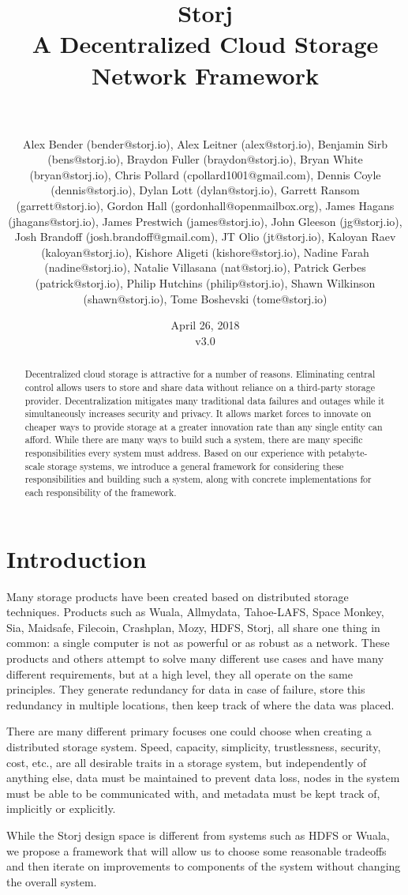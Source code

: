 \documentclass[a4paper,10pt]{article}
\title{\textbf{Storj\\A Decentralized Cloud Storage Network Framework}}
\author{\\
\parbox{\linewidth}{\centering\small
Alex Bender (bender@storj.io),
Alex Leitner (alex@storj.io),
Benjamin Sirb (bens@storj.io),
Braydon Fuller (braydon@storj.io),
Bryan White (bryan@storj.io),
Chris Pollard (cpollard1001@gmail.com),
Dennis Coyle (dennis@storj.io),
Dylan Lott (dylan@storj.io),
Garrett Ransom (garrett@storj.io),
Gordon Hall (gordonhall@openmailbox.org),
James Hagans (jhagans@storj.io),
James Prestwich (james@storj.io),
John Gleeson (jg@storj.io),
Josh Brandoff (josh.brandoff@gmail.com),
JT Olio (jt@storj.io),
Kaloyan Raev (kaloyan@storj.io),
Kishore Aligeti (kishore@storj.io),
Nadine Farah (nadine@storj.io),
Natalie Villasana (nat@storj.io),
Patrick Gerbes (patrick@storj.io),
Philip Hutchins (philip@storj.io),
Shawn Wilkinson (shawn@storj.io),
Tome Boshevski (tome@storj.io)}
}
\date {April 26, 2018 \\ v3.0}
\begin{document}
\maketitle

\begin{abstract}
Decentralized cloud storage is attractive for a number of reasons. Eliminating
central control allows users to store and share data without reliance on a
third-party storage provider. Decentralization mitigates many traditional data
failures and outages while it simultaneously increases security and privacy. It
allows market forces to innovate on cheaper ways to provide storage at a greater
innovation rate than any single entity can afford. While there are many ways to
build such a system, there are many specific responsibilities every system must
address. Based on our experience with petabyte-scale storage systems, we
introduce a general framework for considering these responsibilities and
building such a system, along with concrete implementations for each
responsibility of the framework.
\end{abstract}

\section{Introduction}

Many storage products have been created based on distributed storage
techniques. Products such as Wuala, Allmydata, Tahoe-LAFS, Space Monkey, Sia,
Maidsafe, Filecoin, Crashplan, Mozy, HDFS, Storj, all share one thing in
common: a single computer is not as powerful or as robust as a network. These
products and others attempt to solve many different use cases and have many
different requirements, but at a high level, they all operate on the same
principles. They generate redundancy for data in case of failure, store this
redundancy in multiple locations, then keep track of where the data was placed.

There are many different primary focuses one could choose when creating a
distributed storage system. Speed, capacity, simplicity, trustlessness,
security, cost, etc., are all desirable traits in a storage system, but
independently of anything else, data must be maintained to prevent data loss,
nodes in the system must be able to be communicated with, and metadata must be
kept track of, implicitly or explicitly.

While the Storj design space is different from systems such as HDFS or Wuala,
we propose a framework that will allow us to choose some reasonable tradeoffs
and then iterate on improvements to components of the system without changing
the overall system.
\end{document}
